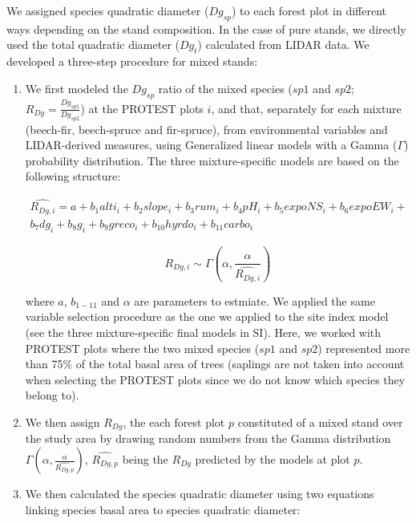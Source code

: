 \documentclass[a4paper]{article}
\begin{document}
We assigned species quadratic diameter ($Dg_{sp}$) to each forest plot in different ways depending on the stand composition. In the case of pure stands, we directly used the total quadratic diameter ($Dg_t$) calculated from LIDAR data. We developed a three-step procedure for mixed stands:

\begin{enumerate}

  \item We first modeled the $Dg_{sp}$ ratio of the mixed species ($sp1$ and $sp2$; $R_{Dg} = \frac{Dg_{sp1}}{Dg_{sp2}}$) at the PROTEST plots $i$, and that, separately for each mixture (beech-fir, beech-spruce and fir-spruce), from environmental variables and LIDAR-derived measures, using Generalized linear models with a Gamma ($\Gamma$) probability distribution. The three mixture-specific models are based on the following structure:

  \begin{multline}\label{DgModel}
    \widehat{R_{Dg, i}} = a + b_1 alti_i + b_2 slope_i + b_3 rum_i + b_4 pH_i + b_5 expoNS_i + b_6 expoEW_i + \\ b_7 dg_i + b_8 g_i + b_9 greco_i + b_{10} hyrdo_i + b_{11} carbo_i
  \end{multline}

  \begin{equation}\label{DgGamma}
    R_{Dg, i} \sim \Gamma(\alpha, \frac{\alpha}{\widehat{R_{Dg, i}}})
  \end{equation}

  where $a$, $b_{1-11}$ and $\alpha$ are parameters to estmiate. We applied the same variable selection procedure as the one we applied to the site index model (see the three mixture-specific final models in SI). Here, we worked with PROTEST plots where the two mixed species ($sp1$ and $sp2$) represented more than 75\% of the total basal area of trees (saplings are not taken into account when selecting the PROTEST plots since we do not know which species they belong to).

  \item We then assign $R_{Dg}$, the each forest plot $p$ constituted of a mixed stand over the study area by drawing random numbers from the Gamma distribution $\Gamma(\alpha, \frac{\alpha}{\widehat{R_{Dg, p}}})$, $\widehat{R_{Dg, p}}$ being the $R_{Dg}$ predicted by the models at plot $p$.

  \item We then calculated the species quadratic diameter using two equations linking species basal area to species quadratic diameter:


\end{enumerate}
\end{document}
